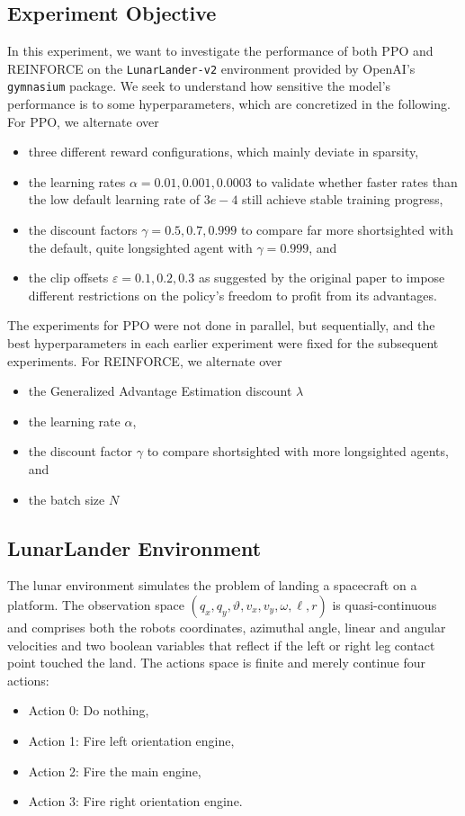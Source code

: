 \documentclass[a4paper, 11pt]{article}
\begin{document}
	\subsection{Experiment Objective}
	In this experiment, we want to investigate the performance of both PPO and REINFORCE on the \texttt{LunarLander-v2} environment provided by OpenAI's \texttt{gymnasium} package. We seek to understand how sensitive the model's performance is to some hyperparameters, which are concretized in the following.
	For PPO, we alternate over
	\begin{itemize}
		\item three different reward configurations, which mainly deviate in sparsity,
		\item the learning rates $\alpha=0.01,0.001,0.0003$ to validate whether faster rates than the low default learning rate of $3e-4$ still achieve stable training progress,
		\item the discount factors $\gamma=0.5,0.7,0.999$ to compare far more shortsighted with the default, quite longsighted agent with $\gamma=0.999$, and
		\item the clip offsets $\varepsilon=0.1,0.2,0.3$ as suggested by the original paper \cite{schulman2017proximal} to impose different restrictions on the policy's freedom to profit from its advantages.
	\end{itemize}
	The experiments for PPO were not done in parallel, but sequentially, and the best hyperparameters in each earlier experiment were fixed for the subsequent experiments.
	For REINFORCE, we alternate over
	\begin{itemize}
		\item the Generalized Advantage Estimation discount $\lambda$
		\item the learning rate $\alpha$,
		\item the discount factor $\gamma$ to compare shortsighted with more longsighted agents, and
		\item the batch size $N$
	\end{itemize}
	\subsection{LunarLander Environment}
	The lunar environment simulates the problem of landing a spacecraft on a platform. The observation space $(q_x,q_y,\vartheta,v_x,v_y,\omega,\ell,r)$ is quasi-continuous and comprises both the robots coordinates, azimuthal angle, linear and angular velocities and two boolean variables that reflect if the left or right leg contact point touched the land.
	The actions space is finite and merely continue four actions:
	\begin{itemize}
		\item Action 0: Do nothing,
		\item Action 1: Fire left orientation engine,
		\item Action 2: Fire the main engine,
		\item Action 3: Fire right orientation engine.
	\end{itemize}
	
\end{document}
